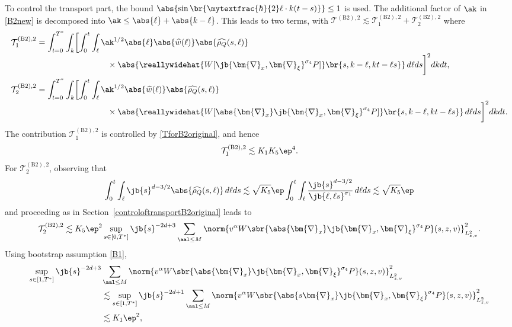To control the transport part, the bound $\abs{\sin\br{\mytextfrac{\hbar}{2}\ell\cdot k(t-s)}}\leq 1$ is used. The additional factor of $\ak$ in \eqref{B2new} is decomposed into $\ak\leq \abs{\ell}+\abs{k-\ell}$. This leads to two terms, with $\mathcal {T}^{\mathrm{(B2),2}}\lesssim\mathcal {T}^{\mathrm{(B2),2}}_1+\mathcal {T}^{\mathrm{(B2),2}}_2$ where\vspace*{-3pt}
\begin{align*}
\mathcal {T}^{\mathrm{(B2),2}}_1&=\int_{t=0}^{T^*}\int_k\biggl[\int_0^t\int_\ell\ak^{{1/2}}\abs{\ell}\abs{\widehat w(\ell)}\abs{\widehat{\rho_Q}(s,\ell)}\\[-3pt]
&\hspace{3cm}\times\abs{\reallywidehat {W[\jb{\bm{\nabla}_x,\bm{\nabla}_{\xi}}^{\sigma_4}P]}\br{s,k-\ell,kt-\ell s}}\,d\ell ds\biggr]^2dkdt,\\
\mathcal {T}^{\mathrm{(B2),2}}_2&=\int_{t=0}^{T^*}\int_k\biggl[\int_0^t\int_\ell\ak^{{1/2}}\abs{\widehat w(\ell)}\abs{\widehat{\rho_Q}(s,\ell)}\\[-3pt]
&\hspace{3cm}\times\abs{\reallywidehat {W[\abs{\bm{\nabla}_x}\jb{\bm{\nabla}_x,\bm{\nabla}_{\xi}}^{\sigma_4}P]}\br{s,k-\ell,kt-\ell s}}\,d\ell ds\biggr]^2dkdt.
\end{align*}
The contribution $\mathcal {T}^{\mathrm{(B2),2}}_1$ is controlled by \eqref{TforB2original}, and hence
\begin{align*}
\mathcal {T}^{\mathrm{(B2),2}}_1\lesssim K_1K_5\ep^4.
\end{align*}
For $\mathcal {T}^{\mathrm{(B2),2}}_2$, observing that\vspace*{-3pt}
\begin{align*}
\int_0^t\int_\ell \jb{s}^{d-3/2}\abs{\widehat{\rho_Q}(s,\ell)}\,d\ell ds\lesssim\sqrt{K_5}\ep\int_0^t\int_\ell \frac{\jb{s}^{d-3/2}}{\jb{\ell,\ell s}^{\sigma_1}}\,d\ell ds\lesssim \sqrt{K_5}\ep
\end{align*}and proceeding as in Section~\ref{controloftransportB2original} leads to
\begin{align*}
\mathcal {T}^{\mathrm{(B2),2}}_2\lesssim K_5\ep^2\sup_{s\in[0,T^*]}\jb{s}^{-2d+3}\sum_{\aal\leq M}\norm{v^\alpha W\sbr{\abs{\bm{\nabla}_x}\jb{\bm{\nabla}_x,\bm{\nabla}_\xi}^{\sigma_4}P}(s,z,v)}_{L^2_{z,v}}^2.
\end{align*}
Using bootstrap assumption \eqref{B1},
\begin{align*}
\sup_{s\in[1,T^*]}\jb{s}^{-2d+3}&\sum_{\aal\leq M}\norm{\vphantom{2_2^2}v^\alpha W\sbr{\abs{\bm{\nabla}_x}\jb{\bm{\nabla}_x,\bm{\nabla}_\xi}^{\sigma_4}P}(s,z,v)}_{L^2_{z,v}}^2\\
&\lesssim\sup_{s\in[1,T^*]}\jb{s}^{-2d+1}\sum_{\aal\leq M}\norm{\vphantom{2_2^2}v^\alpha W\sbr{\abs{s\bm{\nabla}_x}\jb{\bm{\nabla}_x,\bm{\nabla}_\xi}^{\sigma_4}P}(s,z,v)}_{L^2_{z,v}}^2\\
&\lesssim K_1\ep^2,
\end{align*}

